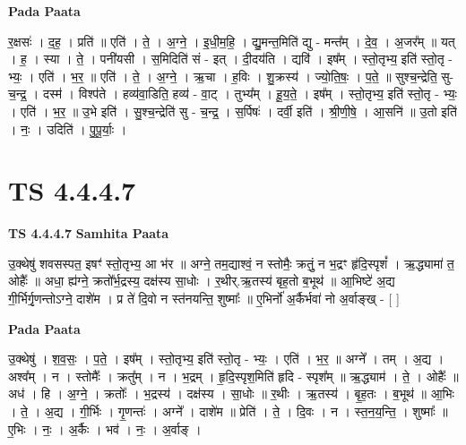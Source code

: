 \documentclass[17pt]{extarticle}
\begin{document}
\textbf{Pada Paata} \newline

र॒क्षसः॑ । द॒ह॒ । प्रति॑ ॥ एति॑ । ते॒ । अ॒ग्ने॒ । इ॒धी॒म॒हि॒ । द्यु॒मन्त॒मिति॑ द्यु - मन्त᳚म् । दे॒व॒ । अ॒जर᳚म् ॥ यत् । ह॒ । स्या । ते॒ । पनी॑यसी । स॒मिदिति॑ सं - इत् । दी॒दय॑ति । द्यवि॑ । इष᳚म् । स्तो॒तृभ्य॒ इति॑ स्तो॒तृ - भ्यः॒ । एति॑ । भ॒र॒ ॥ एति॑ । ते॒ । अ॒ग्ने॒ । ऋ॒चा । ह॒विः । शु॒क्रस्य॑ । ज्यो॒ति॒षः॒ । प॒ते॒ ॥ सुश्च॒न्द्रेति॒ सु-च॒न्द्र॒ । दस्म॑ । विश्प॑ते । हव्य॑वा॒डिति॒ हव्य॑ - वा॒ट् । तुभ्य᳚म् । हू॒य॒ते॒ । इष᳚म् । स्तो॒तृभ्य॒ इति॑ स्तो॒तृ - भ्यः॒ । एति॑ । भ॒र॒ ॥ उ॒भे इति॑ । सु॒श्च॒न्द्रेति॑ सु - च॒न्द्र॒ । स॒र्पिषः॑ । दर्वी॒ इति॑ । श्री॒णी॒षे॒ । आ॒सनि॑ ॥ उ॒तो इति॑ । नः॒ । उदिति॑ । पु॒पू॒र्याः॒ ।  \newline




\section*{ TS 4.4.4.7 }

\textbf{TS 4.4.4.7 } \newline
\textbf{Samhita Paata} \newline

उ॒क्थेषु॑ शवसस्पत॒ इषꣳ॑ स्तो॒तृभ्य॒ आ भ॑र ॥ अग्ने॒ तम॒द्याश्वं॒ न स्तोमैः॒ क्रतुं॒ न भ॒द्रꣳ हृ॑दि॒स्पृशं᳚ । ऋ॒द्ध्यामा॑ त॒ ओहैः᳚ ॥ अधा॒ ह्य॑ग्ने॒ क्रतो᳚र्भ॒द्रस्य॒ दक्ष॑स्य सा॒धोः । र॒थीर्.ऋ॒तस्य॑ बृह॒तो ब॒भूथ॑ ॥ आ॒भिष्टे॑ अ॒द्य गी॒र्भिर्गृ॒णन्तोऽग्ने॒ दाशे॑म । प्र ते॑ दि॒वो न स्त॑नयन्ति॒ शुष्माः᳚ ॥ ए॒भिर्नो॑ अ॒र्कैर्भवा॑ नो अ॒र्वाङ्ख् - [  ] \newline

\textbf{Pada Paata} \newline

उ॒क्थेषु॑ । श॒व॒सः॒ । प॒ते॒ । इष᳚म् । स्तो॒तृभ्य॒ इति॑ स्तो॒तृ - भ्यः॒ । एति॑ । भ॒र॒ ॥ अग्ने᳚ । तम् । अ॒द्य । अश्व᳚म् । न । स्तोमैः᳚ । क्रतु᳚म् । न । भ॒द्रम् । हृ॒दि॒स्पृश॒मिति॑ हृदि - स्पृश᳚म् ॥ ऋ॒द्ध्याम॑ । ते॒ । ओहैः᳚ ॥ अध॑ । हि । अ॒ग्ने॒ । क्रतोः᳚ । भ॒द्रस्य॑ । दक्ष॑स्य । सा॒धोः ॥ र॒थीः । ऋ॒तस्य॑ । बृ॒ह॒तः । ब॒भूथ॑ ॥ आ॒भिः । ते॒ । अ॒द्य । गी॒र्भिः । गृ॒णन्तः॑ । अग्ने᳚ । दाशे॑म ॥ प्रेति॑ । ते॒ । दि॒वः । न । स्त॒न॒य॒न्ति॒ । शुष्माः᳚ ॥ ए॒भिः । नः॒ । अ॒र्कैः । भव॑ । नः॒ । अ॒र्वाङ् ।  \newline




\end{document}
